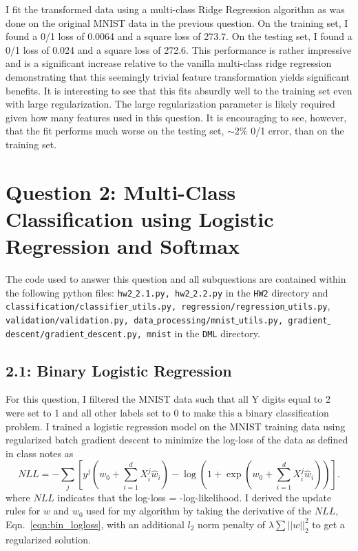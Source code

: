 \documentclass[12pt]{amsart}
\begin{document}
I fit the transformed data using a multi-class Ridge Regression algorithm as was done on the original MNIST data in the previous question.  On the training set, I found a 0/1 loss of 0.0064 and a square loss of 273.7.  On the testing set, I found a 0/1 loss of 0.024 and a square loss of 272.6.  This performance is rather impressive and is a significant increase relative to the vanilla multi-class ridge regression demonstrating that this seemingly trivial feature transformation yields significant benefits.  It is interesting to see that this fits absurdly well to the training set even with large regularization.  The large regularization parameter is likely required given how many features used in this question.  It is encouraging to see, however, that the fit performs much worse on the testing set, ${\sim}2\%$ 0/1 error, than on the training set. 

\section*{Question 2: Multi-Class Classification using Logistic Regression and Softmax}

The code used to answer this question and all subquestions are contained within the following python files: {\tt hw2$\_$2.1.py, hw2$\_$2.2.py} in the {\tt HW2} directory and {\tt classification/classifier$\_$utils.py, regression/regression$\_$utils.py},
 {\tt validation/validation.py, data$\_$processing/mnist$\_$utils.py, gradient$\_$descent/gradient$\_$descent.py, mnist} in the {\tt DML} directory.

\subsection*{2.1: Binary Logistic Regression}

For this question, I filtered the MNIST data such that all Y digits equal to 2 were set to 1 and all other labels set to 0 to make this a binary classification problem.  I trained a logistic regression model on the MNIST training data using regularized batch gradient descent to minimize the log-loss of the data as defined in class notes as
\begin{equation} \label{eqn:bin_logloss}
NLL = -\sum_j [y^j (w_0 + \sum_{i=1}^d X_i^j \hat{w}_i) - \log(1+ \exp(w_0 + \sum_{i=1}^d X_i^j \hat{w}_i))].
\end{equation}
where $NLL$ indicates that the log-loss = -log-likelihood.  I derived the update rules for $w$ and $w_0$ used for my algorithm by taking the derivative of the $NLL$, Eqn.~\ref{eqn:bin_logloss}, with an additional $l_2$ norm penalty of $\lambda \sum||w||^2_2$ to get a regularized solution.  
\end{document}
